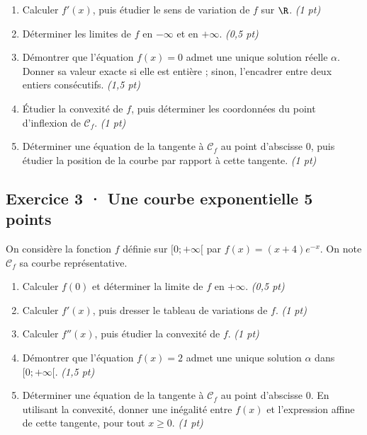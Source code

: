 \begin{enumerate}

\item Calculer $f' (x)$, puis étudier le sens de variation de $f$ sur $\R$. \hfill\textit{(1 pt)}

\item Déterminer les limites de $f$ en $-\infty$ et en $+\infty$. \hfill\textit{(0,5 pt)}

\item Démontrer que l'équation $f(x)=0$ admet une unique solution réelle $\alpha$. Donner sa valeur exacte si elle est entière ; sinon, l'encadrer entre deux entiers consécutifs. \hfill\textit{(1,5 pt)}

\item Étudier la convexité de $f$, puis déterminer les coordonnées du point d'inflexion de $\mathcal C_f$. \hfill\textit{(1 pt)}

\item Déterminer une équation de la tangente à $\mathcal C_f$ au point d'abscisse $0$, puis étudier la position de la courbe par rapport à cette tangente. \hfill\textit{(1 pt)}

\end{enumerate}

\clearpage{}\par

\subsection*{Exercice 3 · Une courbe exponentielle \hfill 5 points}On considère la fonction $f$ définie sur $[0;+\infty[$ par $f(x)=(x+4)e^{-x}$. On note $\mathcal C_f$ sa courbe représentative.

\begin{enumerate}

\item Calculer $f(0)$ et déterminer la limite de $f$ en $+\infty$. \hfill\textit{(0,5 pt)}

\item Calculer $f' (x)$, puis dresser le tableau de variations de $f$. \hfill\textit{(1 pt)}

\item Calculer $f'' (x)$, puis étudier la convexité de $f$. \hfill\textit{(1 pt)}

\item Démontrer que l'équation $f(x)=2$ admet une unique solution $\alpha$ dans $[0;+\infty[$. \hfill\textit{(1,5 pt)}

\item Déterminer une équation de la tangente à $\mathcal C_f$ au point d'abscisse $0$. En utilisant la convexité, donner une inégalité entre $f(x)$ et l'expression affine de cette tangente, pour tout $x\ge0$. \hfill\textit{(1 pt)}

\end{enumerate}

